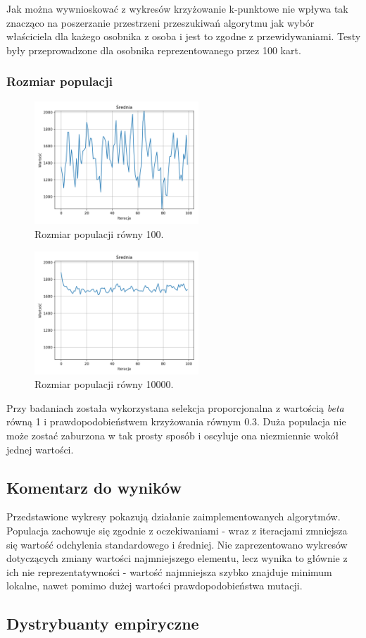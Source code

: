\documentclass[12pt]{article}
\begin{document}
Jak można wywnioskować z wykresów krzyżowanie k-punktowe nie wpływa tak znacząco na poszerzanie przestrzeni przeszukiwań algorytmu jak wybór właściciela dla każego osobnika z osoba i jest to zgodne z przewidywaniami. Testy były przeprowadzone dla osobnika reprezentowanego przez 100 kart. 

\newpage
\subsubsection{Rozmiar populacji}
\begin{figure}[ht]
	\centering					\includegraphics[width=0.55\textwidth]{pop_1.png}
	\caption{Rozmiar populacji równy 100.}
	\label{fig1}
\end{figure}


\begin{figure}[ht]
	\centering					\includegraphics[width=0.55\textwidth]{pop_2.png}
	\caption{Rozmiar populacji równy 10000.}
	\label{fig1}
\end{figure}

Przy badaniach została wykorzystana selekcja proporcjonalna z wartością \textit{beta} równą 1 i prawdopodobieństwem krzyżowania równym 0.3. Duża populacja nie może zostać zaburzona w tak prosty sposób i oscyluje ona niezmiennie wokół jednej wartości.   


\subsection{Komentarz do wyników}
Przedstawione wykresy pokazują działanie zaimplementowanych algorytmów. Populacja zachowuje się zgodnie z oczekiwaniami - wraz z iteracjami zmniejsza się wartość odchylenia standardowego i średniej. Nie zaprezentowano wykresów dotyczących zmiany wartości najmniejszego elementu, lecz wynika to głównie z ich nie reprezentatywności - wartość najmniejsza szybko znajduje minimum lokalne, nawet pomimo dużej wartości prawdopodobieństwa mutacji.

\subsection{Dystrybuanty empiryczne}
\end{document}
